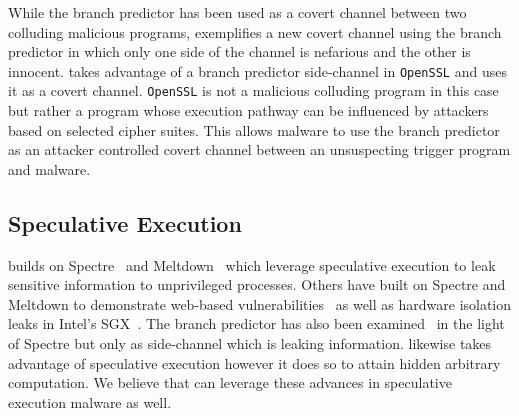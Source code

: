 While the branch predictor has been used as a covert channel between two
colluding malicious programs, \speculake exemplifies a new covert channel using
the branch predictor in which only one side of the channel is nefarious and the
other is innocent. \speculake takes advantage of a branch predictor side-channel
in \texttt{OpenSSL} and uses it as a covert channel. \texttt{OpenSSL} is not a
malicious colluding program in this case but rather a program whose execution
pathway can be influenced by attackers based on selected cipher suites. This
allows malware to use the branch predictor as an attacker controlled covert
channel between an unsuspecting trigger program and \speculake malware.




\subsection{Speculative Execution}

\speculake builds on Spectre~\cite{spectre} and Meltdown~\cite{meltdown} which
leverage speculative execution to leak sensitive information to unprivileged
processes.  Others have built on Spectre and Meltdown to demonstrate web-based
vulnerabilities~\cite{genkin2018drive, schwarz2018netspectre} as well as
hardware isolation leaks in Intel's SGX~\cite{spectre_sgx,chen2018sgxpectre}.
The branch predictor has also been examined~\cite{evtyushkin2018branchscope} in
the light of Spectre but only as side-channel which is leaking information.
\speculake likewise takes advantage of speculative execution however it does so
to attain hidden arbitrary computation. We believe that \speculake can leverage
these advances in speculative execution malware as well.
